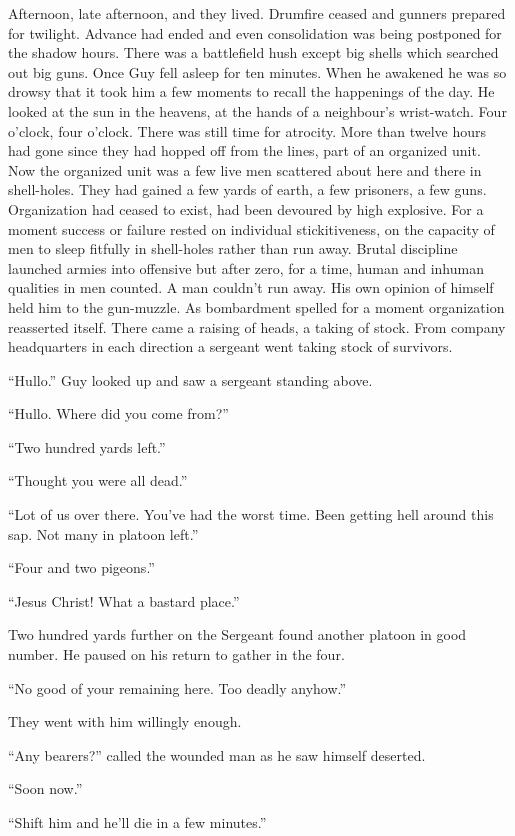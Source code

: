 Afternoon, late afternoon, and they lived. Drumfire ceased and gunners prepared for twilight. Advance had ended and even consolidation was being postponed for the shadow hours. There was a battlefield hush except big shells which searched out big guns. Once Guy fell asleep for ten minutes. When he awakened he was so drowsy that it took him a few moments to recall the happenings of the day. He looked at the sun in the heavens, at the hands of a neighbour's wrist-watch. Four o'clock, four o'clock. There was still time for atrocity. More than twelve hours had gone since they had hopped off from the lines, part of an organized unit. Now the organized unit was a few live men scattered about here and there in shell-holes. They had gained a few yards of earth, a few prisoners, a few guns. Organization had ceased to exist, had been devoured by high explosive. For a moment success or failure rested on individual stickitiveness, on the capacity of men to sleep fitfully in shell-holes rather than run away. Brutal discipline launched armies into offensive but after zero, for a time, human and inhuman qualities in men counted. A man couldn't run away. His own opinion of himself held him to the gun-muzzle. As bombardment spelled for a moment organization reasserted itself. There came a raising of heads, a taking of stock. From company headquarters in each direction a sergeant went taking stock of survivors.

``Hullo.'' Guy looked up and saw a sergeant standing above.

``Hullo. Where did you come from?''

``Two hundred yards left.''

``Thought you were all dead.''

``Lot of us over there. You've had the worst time. Been getting hell around this sap. Not many in platoon left.''

``Four and two pigeons.''

``Jesus Christ! What a bastard place.''

Two hundred yards further on the Sergeant found another platoon in good number. He paused on his return to gather in the four.

``No good of your remaining here. Too deadly anyhow.''

They went with him willingly enough.

``Any bearers?'' called the wounded man as he saw himself deserted.

``Soon now.''

``Shift him and he'll die in a few minutes.''

